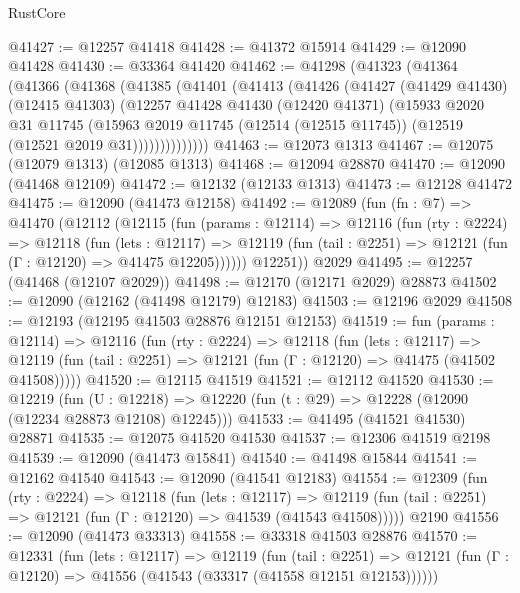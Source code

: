 \begin{lexlean}{RustCore}
\begin{coremodule}
@41427 := @12257 @41418
@41428 := @41372 @15914
@41429 := @12090 @41428
@41430 := @33364 @41420
@41462 := @41298
    (@41323
      (@41364
        (@41366
          (@41368
            (@41385
              (@41401
                (@41413
                  (@41426
                    (@41427
                      (@41429 @41430)
                      (@12415 @41303)
                      (@12257
                        @41428
                        @41430
                        (@12420 @41371)
                        (@15933
                          @2020
                          @31
                          @11745
                          (@15963
                            @2019
                            @11745
                            (@12514 (@12515 @11745))
                            (@12519 (@12521 @2019 @31))))))))))))))
@41463 := @12073 @1313
@41467 := @12075 (@12079 @1313) (@12085 @1313)
@41468 := @12094 @28870
@41470 := @12090 (@41468 @12109)
@41472 := @12132 (@12133 @1313)
@41473 := @12128 @41472
@41475 := @12090 (@41473 @12158)
@41492 := @12089
    (fun (fn : @7) =>
    @41470
      (@12112
        (@12115
          (fun (params : @12114) =>
          @12116
            (fun (rty : @2224) =>
            @12118
              (fun (lets : @12117) =>
              @12119 (fun (tail : @2251) => @12121 (fun (Γ : @12120) => @41475 @12205))))))
        @12251))
    @2029
@41495 := @12257 (@41468 (@12107 @2029))
@41498 := @12170 (@12171 @2029) @28873
@41502 := @12090 (@12162 (@41498 @12179) @12183)
@41503 := @12196 @2029
@41508 := @12193 (@12195 @41503 @28876 @12151 @12153)
@41519 := fun (params : @12114) =>
  @12116
    (fun (rty : @2224) =>
    @12118
      (fun (lets : @12117) =>
      @12119 (fun (tail : @2251) => @12121 (fun (Γ : @12120) => @41475 (@41502 @41508)))))
@41520 := @12115 @41519
@41521 := @12112 @41520
@41530 := @12219
    (fun (U : @12218) => @12220 (fun (t : @29) => @12228 (@12090 (@12234 @28873 @12108) @12245)))
@41533 := @41495 (@41521 @41530) @28871
@41535 := @12075 @41520 @41530
@41537 := @12306 @41519 @2198
@41539 := @12090 (@41473 @15841)
@41540 := @41498 @15844
@41541 := @12162 @41540
@41543 := @12090 (@41541 @12183)
@41554 := @12309
    (fun (rty : @2224) =>
    @12118
      (fun (lets : @12117) =>
      @12119 (fun (tail : @2251) => @12121 (fun (Γ : @12120) => @41539 (@41543 @41508)))))
    @2190
@41556 := @12090 (@41473 @33313)
@41558 := @33318 @41503 @28876
@41570 := @12331
    (fun (lets : @12117) =>
    @12119
      (fun (tail : @2251) =>
      @12121 (fun (Γ : @12120) => @41556 (@41543 (@33317 (@41558 @12151 @12153))))))

\end{coremodule}
\end{lexlean}
